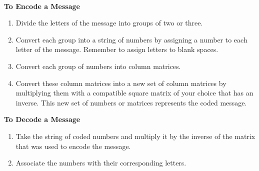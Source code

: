 \begin{summarybox}
    ~\\
    \textbf{To Encode a Message}
    \begin{enumerate}
        \item Divide the letters of the message into groups of two or three.
        \item Convert each group into a string of numbers by assigning a number to each letter of the message. Remember to assign letters to blank spaces.
        \item Convert each group of numbers into column matrices.
        \item Convert these column matrices into a new set of column matrices by multiplying them with a compatible square matrix of your choice that has an inverse. This new set of numbers or matrices represents the coded message.
    \end{enumerate}

    \textbf{To Decode a Message}
    \begin{enumerate}
        \item Take the string of coded numbers and multiply it by the inverse of the matrix that was used to encode the message.
        \item Associate the numbers with their corresponding letters.
    \end{enumerate}
\end{summarybox}
